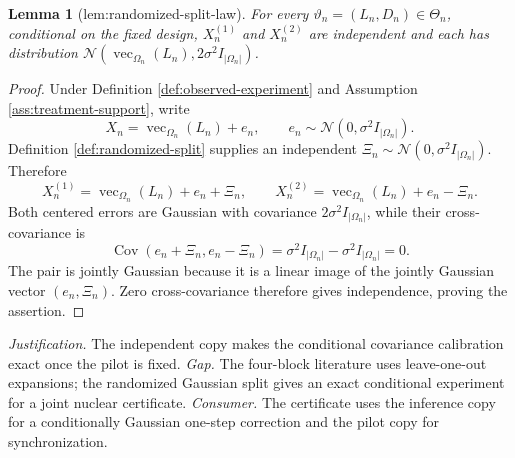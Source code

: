 \documentclass{article}
\newtheorem{lemma}{Lemma}
\begin{document}
\begin{lemma}[lem:randomized-split-law]\label{lem:randomized-split-law}
For every \(\vartheta_n=(L_n,D_n)\in\Theta_n\), conditional on the fixed design, \(X_n^{(1)}\) and \(X_n^{(2)}\) are independent and each has distribution \(\mathcal N(\operatorname{vec}_{\Omega_n}(L_n),2\sigma^2I_{|\Omega_n|})\).
\end{lemma}
\begin{proof}
Under Definition \ref{def:observed-experiment} and Assumption \ref{ass:treatment-support}, write
\[
X_n=\operatorname{vec}_{\Omega_n}(L_n)+e_n,
\qquad
e_n\sim\mathcal N(0,\sigma^2I_{|\Omega_n|}).
\]
Definition \ref{def:randomized-split} supplies an independent
\(\Xi_n\sim\mathcal N(0,\sigma^2I_{|\Omega_n|})\).  Therefore
\[
X_n^{(1)}=\operatorname{vec}_{\Omega_n}(L_n)+e_n+\Xi_n,
\qquad
X_n^{(2)}=\operatorname{vec}_{\Omega_n}(L_n)+e_n-\Xi_n.
\]
Both centered errors are Gaussian with covariance \(2\sigma^2I_{|\Omega_n|}\), while their cross-covariance is
\[
\operatorname{Cov}(e_n+\Xi_n,e_n-\Xi_n)
=\sigma^2I_{|\Omega_n|}-\sigma^2I_{|\Omega_n|}=0.
\]
The pair is jointly Gaussian because it is a linear image of the jointly Gaussian vector \((e_n,\Xi_n)\).  Zero cross-covariance therefore gives independence, proving the assertion.
\end{proof}
\par\smallskip\noindent \textit{Justification.} The independent copy makes the conditional covariance calibration exact once the pilot is fixed. \textit{Gap.} The four-block literature uses leave-one-out expansions; the randomized Gaussian split gives an exact conditional experiment for a joint nuclear certificate. \textit{Consumer.} The certificate uses the inference copy for a conditionally Gaussian one-step correction and the pilot copy for synchronization.
\end{document}
